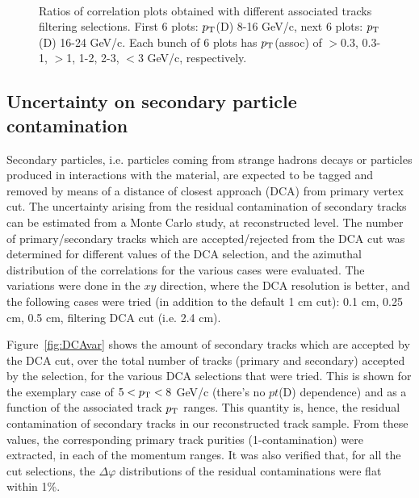 \begin{figure}[h]
 \\
 \caption{Ratios of correlation plots obtained with different associated tracks filtering selections. First 6 plots: $p_{\rm T}$(D) 8-16 GeV/c, next 6 plots: $p_{\rm T}$(D) 16-24 GeV/c. Each bunch of 6 plots has $p_{\rm T}$(assoc) of $>$0.3, 0.3-1, $>$1, 1-2, 2-3, $<$3 GeV/c, respectively.}
 \label{fig:Syst_EffTrack2}
\end{figure}

\subsection{Uncertainty on secondary particle contamination}
Secondary particles, i.e. particles coming from strange hadrons decays or particles produced in interactions with the material, are expected to be tagged and removed by means of a distance of closest approach (DCA) from primary vertex cut. The uncertainty arising from the residual contamination of secondary tracks can be estimated from a Monte Carlo study, at reconstructed level. The number of primary/secondary tracks which are accepted/rejected from the DCA cut was determined for different values of the DCA selection, and the azimuthal distribution of the correlations for the various cases were evaluated. The variations were done in the $xy$ direction, where the DCA resolution is better, and the following cases were tried (in addition to the default 1 cm cut): 0.1 cm, 0.25 cm, 0.5 cm, filtering DCA cut (i.e. 2.4 cm).

Figure~\ref{fig:DCAvar} shows the amount of secondary tracks which are accepted by the DCA cut, over the total number of tracks (primary and secondary) accepted by the selection, for the various DCA selections that were tried. This is shown for the exemplary case of $5 < p_{\rm T} < 8$ GeV/c (there's no $pt$(D) dependence) and as a function of the associated track $p_{\rm T}$ ranges. This quantity is, hence, the residual contamination of secondary tracks in our reconstructed track sample. From these values, the corresponding primary track purities (1-contamination) were extracted, in each of the momentum ranges.
It was also verified that, for all the cut selections, the $\Delta\varphi$ distributions of the residual contaminations were flat within 1\%.

